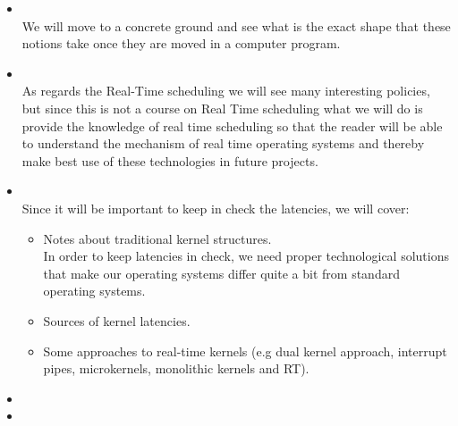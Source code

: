 \begin{itemize}
\item {}\\
We will move to a concrete ground and see what is the exact shape that these notions take once they are moved in a computer program. 
\item {}\\
As regards the Real-Time scheduling we will see many interesting policies, but since this is  not a course on Real Time scheduling what we will do is provide the knowledge of real time scheduling so that the reader will be able to understand the mechanism of real time operating systems and thereby make best use of these technologies in future projects.
\item {}\\
Since it will be important to keep in check the latencies, we will cover:
\begin{itemize}
\item Notes about traditional kernel structures.\\
In order to keep latencies in check, we need proper technological solutions that make our operating systems differ quite a bit from standard operating systems.
\item Sources of kernel latencies.\\
\item Some approaches to real-time kernels (e.g dual kernel approach, interrupt pipes, microkernels, monolithic kernels and RT). 
\end{itemize}
\item {}
\item {}
\end{itemize}

